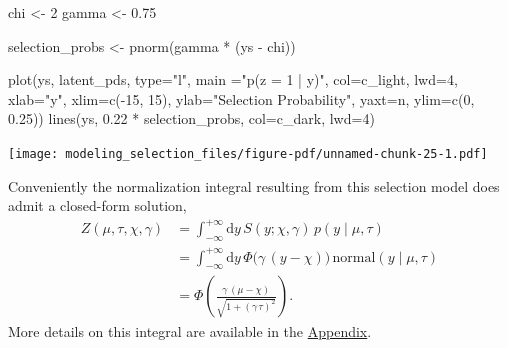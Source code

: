 \documentclass[
  letterpaper,
  DIV=11,
  numbers=noendperiod]{scrartcl}
\newenvironment{Shaded}{\begin{snugshade}}{\end{snugshade}}
\newcommand{\AttributeTok}[1]{\textcolor[rgb]{0.40,0.45,0.13}{#1}}
\newcommand{\DecValTok}[1]{\textcolor[rgb]{0.68,0.00,0.00}{#1}}
\newcommand{\FloatTok}[1]{\textcolor[rgb]{0.68,0.00,0.00}{#1}}
\newcommand{\FunctionTok}[1]{\textcolor[rgb]{0.28,0.35,0.67}{#1}}
\newcommand{\NormalTok}[1]{\textcolor[rgb]{0.00,0.23,0.31}{#1}}
\newcommand{\OtherTok}[1]{\textcolor[rgb]{0.00,0.23,0.31}{#1}}
\newcommand{\SpecialCharTok}[1]{\textcolor[rgb]{0.37,0.37,0.37}{#1}}
\newcommand{\StringTok}[1]{\textcolor[rgb]{0.13,0.47,0.30}{#1}}
\begin{document}
\begin{Shaded}
\begin{Highlighting}[]
\NormalTok{chi }\OtherTok{\textless{}{-}} \DecValTok{2}
\NormalTok{gamma }\OtherTok{\textless{}{-}} \FloatTok{0.75}

\NormalTok{selection\_probs }\OtherTok{\textless{}{-}} \FunctionTok{pnorm}\NormalTok{(gamma }\SpecialCharTok{*}\NormalTok{ (ys }\SpecialCharTok{{-}}\NormalTok{ chi))}

\FunctionTok{plot}\NormalTok{(ys, latent\_pds, }\AttributeTok{type=}\StringTok{"l"}\NormalTok{, }\AttributeTok{main =}\StringTok{"p(z = 1 | y)"}\NormalTok{, }\AttributeTok{col=}\NormalTok{c\_light, }\AttributeTok{lwd=}\DecValTok{4}\NormalTok{,}
     \AttributeTok{xlab=}\StringTok{"y"}\NormalTok{, }\AttributeTok{xlim=}\FunctionTok{c}\NormalTok{(}\SpecialCharTok{{-}}\DecValTok{15}\NormalTok{, }\DecValTok{15}\NormalTok{),}
     \AttributeTok{ylab=}\StringTok{"Selection Probability"}\NormalTok{, }\AttributeTok{yaxt=}\StringTok{\textquotesingle{}n\textquotesingle{}}\NormalTok{, }\AttributeTok{ylim=}\FunctionTok{c}\NormalTok{(}\DecValTok{0}\NormalTok{, }\FloatTok{0.25}\NormalTok{))}
\FunctionTok{lines}\NormalTok{(ys, }\FloatTok{0.22} \SpecialCharTok{*}\NormalTok{ selection\_probs, }\AttributeTok{col=}\NormalTok{c\_dark, }\AttributeTok{lwd=}\DecValTok{4}\NormalTok{)}
\end{Highlighting}
\end{Shaded}

\texttt{[image: modeling\_selection\_files/figure-pdf/unnamed-chunk-25-1.pdf]}

Conveniently the normalization integral resulting from this selection
model does admit a closed-form solution, \begin{align*}
Z(\mu, \tau, \chi, \gamma)
&=
\int_{-\infty}^{+\infty} \mathrm{d} y \,
S(y; \chi, \gamma) \, p(y \mid \mu, \tau)
\\
&=
\int_{-\infty}^{+\infty} \mathrm{d} y \,
\Phi \big( \gamma \, (y - \chi) \big) \,
\text{normal}(y \mid \mu, \tau)
\\
&=
\Phi \left( \frac{ \gamma \, (\mu - \chi) }
                 { \sqrt{1 + (\gamma \, \tau)^{2} } } \right).
\end{align*} More details on this integral are available in the
\href{@sec:appendix_uni}{Appendix}.
\end{document}
